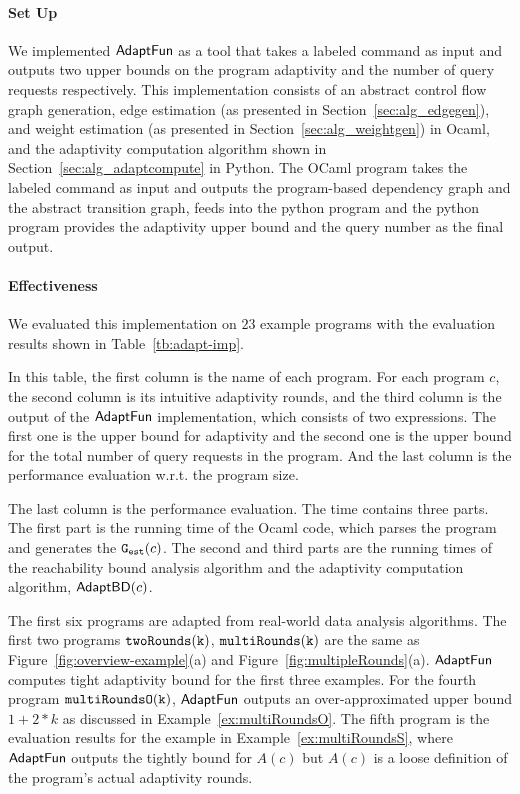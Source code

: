 
\paragraph{Set Up}
We implemented $\textsf{AdaptFun}$ as a tool that takes a labeled command as input 
and outputs two upper bounds on the program adaptivity and the number of query requests respectively.
This implementation consists of an 
abstract control flow graph generation,
edge estimation (as presented in Section~\ref{sec:alg_edgegen}), and weight estimation (as presented in Section~\ref{sec:alg_weightgen}) in Ocaml, 
and the adaptivity computation algorithm shown in Section~\ref{sec:alg_adaptcompute} in Python.
The OCaml program takes the labeled command as input and outputs the program-based dependency graph and
the abstract transition graph,
feeds into the python program and the python program provides the adaptivity upper bound and the query number as the final output.


\paragraph{Effectiveness}
We evaluated this implementation on $23$ example programs with the evaluation results shown in Table~\ref{tb:adapt-imp}.


In this table,
the first column is the name of each program.
For each program $c$, the second column is its intuitive adaptivity rounds,
and the third column is the output of the $\textsf{AdaptFun}$ implementation, which consists of two expressions.
The first one is the upper bound for adaptivity and the second one is the 
upper bound for the total number of query requests in the program. And the last column is the performance evaluation w.r.t. the program size.

The last column is the performance evaluation.
The time contains three parts. The first part is the running time of the Ocaml code, which parses the program and generates the $\mathtt{{G_{est}}}(c)$.
The second and third parts are the running times of the reachability bound analysis algorithm
and the adaptivity computation algorithm, $\mathsf{AdaptBD}(c)$.

The first six programs are adapted from real-world data analysis algorithms.
The first two programs $\mathtt{twoRounds(k)}$, $ \mathtt{multiRounds(k)}$ are the same as Figure~\ref{fig:overview-example}(a) and Figure~\ref{fig:multipleRounds}(a).
$\textsf{AdaptFun}$ computes tight adaptivity bound for the first three examples.
For the fourth program $\mathtt{multiRoundsO(k)}$, $\textsf{AdaptFun}$ outputs an over-approximated upper bound $1 + 2*k$ 
as discussed in Example~\ref{ex:multiRoundsO}. 
The fifth program is the evaluation results for the example in Example~\ref{ex:multiRoundsS}, where $\textsf{AdaptFun}$ outputs the tightly bound for $A(c)$ but $A(c)$ is a loose definition of the program's actual adaptivity rounds.
%


